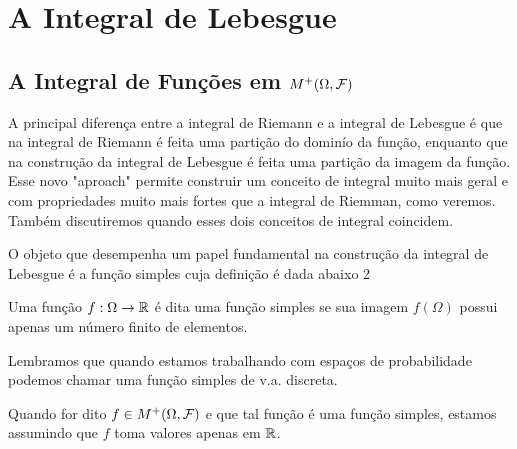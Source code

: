 \chapter[Aula 9]{A Integral de Lebesgue}
\chaptermark{}

\section{A Integral de Funções em $M^{+}(\Omega,\mathcal{F})$}

A principal diferença entre a integral de Riemann e a integral
de Lebesgue é que na integral de Riemann é feita uma 
partição do dominío da função, enquanto que na construção da
 integral de Lebesgue é feita uma partição da imagem da função.
Esse novo  "aproach" permite construir um conceito de integral muito
mais geral e com propriedades muito mais fortes  que a integral de Riemman, 
como veremos. Também discutiremos quando esses dois conceitos 
de integral coincidem.

O objeto que desempenha um papel fundamental na 
construção da integral de Lebesgue é a função simples
cuja definição é dada abaixo 2
%
%
\begin{definicao}\label{def-funcao-simples}
Uma função $f:\Omega\to\mathbb{R}$ é dita uma função simples
se sua imagem $f(\Omega)$ possui apenas um número
finito de elementos.
\end{definicao}
%
%
%
%
\begin{observacao}
Lembramos que quando estamos trabalhando com 
espaços de probabilidade podemos chamar uma
função simples de v.a. discreta.
\end{observacao}


\begin{observacao}
Quando for dito $f\in M^{+}(\Omega,\mathcal{F})$
e que tal função é uma função simples, 
estamos assumindo que $f$ toma valores apenas em $\mathbb{R}$.
\end{observacao}


